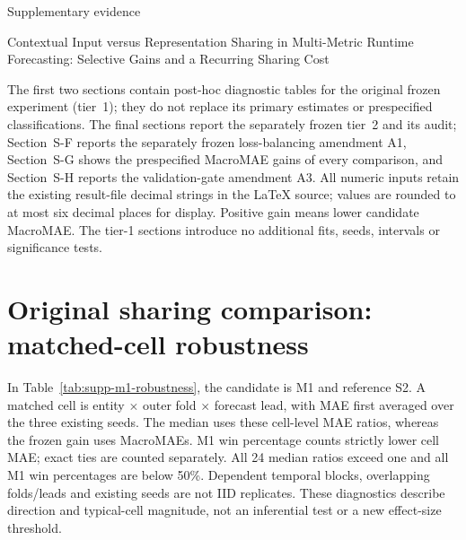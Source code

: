 \documentclass[a4paper,11pt]{article}
\begin{document}
\begin{center}
{\Large Supplementary evidence}\par\medskip
Contextual Input versus Representation Sharing in Multi-Metric Runtime
Forecasting: Selective Gains and a Recurring Sharing Cost
\end{center}

The first two sections contain post-hoc diagnostic tables for the original
frozen experiment (tier~1); they do not replace its primary estimates or
prespecified classifications. The final sections report the separately
frozen tier~2 and its audit; Section~S-F reports the
separately frozen loss-balancing amendment A1, Section~S-G shows the prespecified MacroMAE
gains of every comparison, and Section~S-H reports the validation-gate amendment A3.
All numeric inputs retain the existing result-file decimal strings in the
LaTeX source; values are rounded to at most six decimal places for display.
Positive gain means lower candidate MacroMAE. The tier-1 sections introduce
no additional fits, seeds, intervals or significance tests.

\section*{Original sharing comparison: matched-cell robustness}
In Table~\ref{tab:supp-m1-robustness}, the candidate is M1 and reference S2.
A matched cell is entity $\times$ outer fold $\times$ forecast lead, with
MAE first averaged over the three existing seeds. The median uses these
cell-level MAE ratios, whereas the frozen gain uses MacroMAEs. M1 win
percentage counts strictly lower cell MAE; exact ties are counted separately.
All 24 median ratios exceed one and all M1 win percentages are below 50\%.
Dependent temporal blocks, overlapping folds/leads and existing seeds are
not IID replicates. These diagnostics describe direction and typical-cell
magnitude, not an inferential test or a new effect-size threshold.
\end{document}
